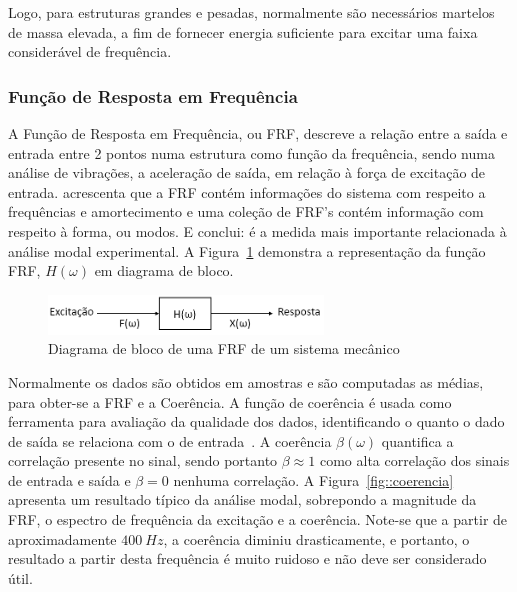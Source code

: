 Logo, para estruturas grandes e pesadas, normalmente são necessários martelos de
massa elevada, a fim de fornecer energia suficiente para excitar uma faixa
considerável de frequência.


\subsubsection{Função de Resposta em Frequência}

A Função de Resposta em Frequência, ou FRF, descreve a relação entre a saída e
entrada entre 2 pontos numa estrutura como função da frequência, sendo numa
análise de vibrações, a aceleração de saída, em relação à força de excitação de
entrada. \citet{avitabile2001experimental} acrescenta que a FRF contém
informações do sistema com respeito a frequências e amortecimento e uma coleção
de FRF's contém informação com respeito à forma, ou modos. E conclui: é a medida
mais importante relacionada à análise modal experimental. A
Figura~\ref{fig::diagrama_frf} demonstra a representação da função FRF,
$H(\omega)$ em diagrama de bloco.

\begin{figure}[h]
	\centering 
 	\includegraphics[width=0.65\textwidth]{figs/diagrama_frf}
 	\caption{Diagrama de bloco de uma FRF de um sistema mecânico}
 	\label{fig::diagrama_frf}
\end{figure}

Normalmente os dados são obtidos em amostras e são computadas as médias, para
obter-se a FRF e a Coerência. A função de coerência é usada como ferramenta para
avaliação da qualidade dos dados, identificando o quanto o dado de saída se
relaciona com o de entrada~\cite{avitabile2001experimental}. A coerência
$\beta(\omega)$ quantifica a correlação presente no sinal, sendo portanto $\beta
\approx 1$ como alta correlação dos sinais de entrada e saída e $\beta = 0$
nenhuma correlação. A Figura~\ref{fig::coerencia} apresenta um resultado típico
da análise modal, sobrepondo a magnitude da FRF, o espectro de frequência da
excitação e a coerência. Note-se que a partir de aproximadamente $400~Hz$, a
coerência diminiu drasticamente, e portanto, o resultado a partir desta
frequência é muito ruidoso e não deve ser considerado útil.

